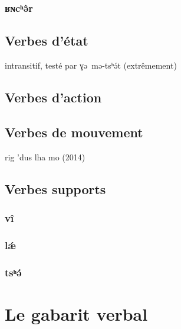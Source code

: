 \documentclass[11pt, a4paper]{book}              %
\newcommand{\ipa}[1]{{\phon \mbox{#1}}} %
\begin{document}
\subsection{\ipa{ʁɴcʰə̂r}}

\section{Verbes d'état}

intransitif, testé par \ipa{ɣə mə-tsʰə́t} (extrêmement)

\section{Verbes d'action}
\section{Verbes de mouvement}

rig 'dus lha mo (2014)

\section{Verbes supports}

\subsection{\ipa{vî}}

\subsection{\ipa{lǽ}}

\subsection{\ipa{tsʰə́}}

\chapter{Le gabarit verbal}
\end{document}
